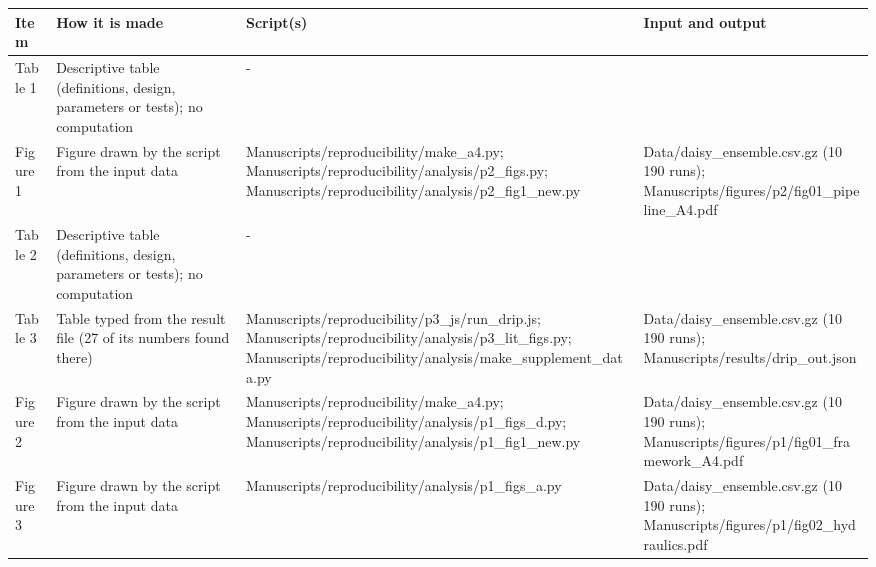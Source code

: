 {\scriptsize\begin{longtable}{p{}p{}p{}p{}}\toprule\textbf{Item} & \textbf{How it is made} & \textbf{Script(s)} & \textbf{Input and output}\\\midrule\endhead
{}Table 1 & Descriptive table (definitions, design, parameters or tests); no computation & - & \\
{}Figure 1 & Figure drawn by the script from the input data & Manuscripts/\allowbreak{}reproducibility/\allowbreak{}make\_\allowbreak{}a4.py;  Manuscripts/\allowbreak{}reproducibility/\allowbreak{}analysis/\allowbreak{}p2\_\allowbreak{}figs.py;  Manuscripts/\allowbreak{}reproducibility/\allowbreak{}analysis/\allowbreak{}p2\_\allowbreak{}fig1\_\allowbreak{}new.py & Data/\allowbreak{}daisy\_\allowbreak{}ensemble.csv.gz (10 190 runs);  Manuscripts/\allowbreak{}figures/\allowbreak{}p2/\allowbreak{}fig01\_\allowbreak{}pipeline\_\allowbreak{}A4.pdf\\
{}Table 2 & Descriptive table (definitions, design, parameters or tests); no computation & - & \\
{}Table 3 & Table typed from the result file (27 of its numbers found there) & Manuscripts/\allowbreak{}reproducibility/\allowbreak{}p3\_\allowbreak{}js/\allowbreak{}run\_\allowbreak{}drip.js;  Manuscripts/\allowbreak{}reproducibility/\allowbreak{}analysis/\allowbreak{}p3\_\allowbreak{}lit\_\allowbreak{}figs.py;  Manuscripts/\allowbreak{}reproducibility/\allowbreak{}analysis/\allowbreak{}make\_\allowbreak{}supplement\_\allowbreak{}data.py & Data/\allowbreak{}daisy\_\allowbreak{}ensemble.csv.gz (10 190 runs);  Manuscripts/\allowbreak{}results/\allowbreak{}drip\_\allowbreak{}out.json\\
{}Figure 2 & Figure drawn by the script from the input data & Manuscripts/\allowbreak{}reproducibility/\allowbreak{}make\_\allowbreak{}a4.py;  Manuscripts/\allowbreak{}reproducibility/\allowbreak{}analysis/\allowbreak{}p1\_\allowbreak{}figs\_\allowbreak{}d.py;  Manuscripts/\allowbreak{}reproducibility/\allowbreak{}analysis/\allowbreak{}p1\_\allowbreak{}fig1\_\allowbreak{}new.py & Data/\allowbreak{}daisy\_\allowbreak{}ensemble.csv.gz (10 190 runs);  Manuscripts/\allowbreak{}figures/\allowbreak{}p1/\allowbreak{}fig01\_\allowbreak{}framework\_\allowbreak{}A4.pdf\\
{}Figure 3 & Figure drawn by the script from the input data & Manuscripts/\allowbreak{}reproducibility/\allowbreak{}analysis/\allowbreak{}p1\_\allowbreak{}figs\_\allowbreak{}a.py & Data/\allowbreak{}daisy\_\allowbreak{}ensemble.csv.gz (10 190 runs);  Manuscripts/\allowbreak{}figures/\allowbreak{}p1/\allowbreak{}fig02\_\allowbreak{}hydraulics.pdf\\

\end{longtable}}
